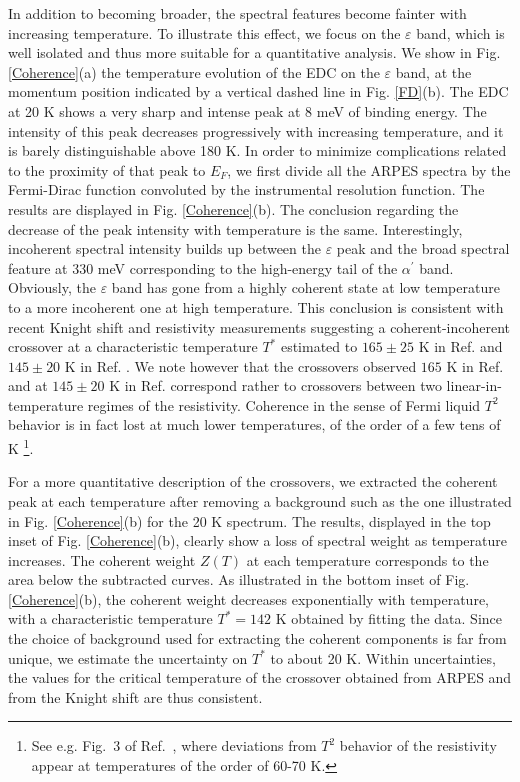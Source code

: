 \documentclass[twocolumn,aps,showpacs,preprintnumbers,amsmath,amssymb, superscriptaddress,longbibliography]{revtex4-1}
\begin{document}
In addition to becoming broader, the spectral features become fainter with increasing temperature. To illustrate this effect, we focus on the $\varepsilon$ band, which is well isolated and thus more suitable for a quantitative analysis. We show in Fig. \ref{Coherence}(a) the temperature evolution of the EDC on the $\varepsilon$ band, at the momentum position indicated by a vertical dashed line in Fig. \ref{FD}(b). The EDC at 20 K shows a very sharp and intense peak at 8 meV of binding energy. The intensity of this peak decreases progressively with increasing temperature, and it is barely distinguishable above 180 K. In order to minimize complications related to the proximity of that peak to $E_F$, we first divide all the ARPES spectra by the Fermi-Dirac function convoluted by the instrumental resolution function. The results are displayed in Fig. \ref{Coherence}(b). The conclusion regarding the decrease of the peak intensity with temperature is the same. Interestingly, incoherent spectral intensity builds up between the $\varepsilon$ peak and the broad spectral feature at 330 meV corresponding to the high-energy tail of the $\alpha^{\prime}$ band. Obviously, the $\varepsilon$ band has gone from a highly coherent state at low temperature to a more incoherent one at high temperature. This conclusion is consistent with recent Knight shift and resistivity measurements suggesting a coherent-incoherent crossover at a characteristic temperature $T^*$ estimated to $165\pm 25$ K in Ref. \cite{YP_Wu_PRL116} and $145\pm 20$ K in Ref. \cite{Wiecki_PRB97}.
We note however that the crossovers observed $165$ K in Ref. \cite{YP_Wu_PRL116} and at $145\pm 20$ K in Ref. \cite{Wiecki_PRB97} correspond rather to crossovers between two linear-in-temperature regimes of the resistivity. Coherence in the sense of Fermi liquid $T^2$ behavior is in fact lost at much lower temperatures, of the order of a few tens of K %
\footnote{See e.g. Fig.~3 of Ref.~\cite{TaufourPRB89}, where deviations from $T^2$ behavior of the resistivity appear at temperatures of the order of 60-70 K.}.


For a more quantitative description of the crossovers, we extracted the coherent peak at each temperature after removing a background such as the one illustrated in Fig. \ref{Coherence}(b) for the 20 K spectrum. The results, displayed in the top inset of Fig. \ref{Coherence}(b), clearly show a loss of
spectral weight as temperature increases. The coherent weight $Z(T)$ at each temperature corresponds to the area below the subtracted curves. As illustrated in the bottom inset of Fig. \ref{Coherence}(b), the coherent weight decreases exponentially with temperature, with a characteristic temperature $T^*=142$ K obtained by fitting the data. Since the choice of background used for extracting the coherent components is far from unique, we estimate the uncertainty on $T^*$ to about 20 K. Within uncertainties, the values for the critical temperature of the crossover obtained from ARPES and from the Knight shift are thus consistent.  
\end{document}
